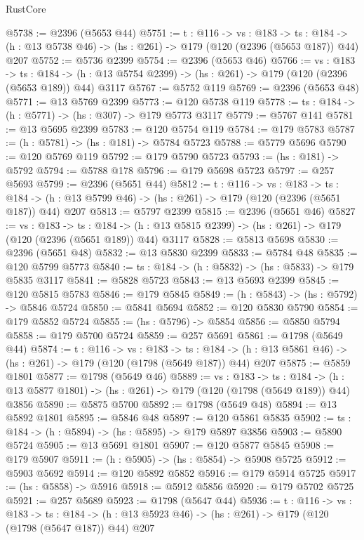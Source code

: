 \begin{lexlean}{RustCore}
\begin{coremodule}
@5738 := @2396 (@5653 @44)
@5751 := {t : @116} ->
  {vs : @183} ->
  {ts : @184} -> (h : @13 @5738 @46) -> (hs : @261) -> @179 (@120 (@2396 (@5653 @187)) @44) @207
@5752 := @5736 @2399
@5754 := @2396 (@5653 @46)
@5766 := {vs : @183} ->
  {ts : @184} -> (h : @13 @5754 @2399) -> (hs : @261) -> @179 (@120 (@2396 (@5653 @189)) @44) @3117
@5767 := @5752 @119
@5769 := @2396 (@5653 @48)
@5771 := @13 @5769 @2399
@5773 := @120 @5738 @119
@5778 := {ts : @184} -> (h : @5771) -> (hs : @307) -> @179 @5773 @3117
@5779 := @5767 @141
@5781 := @13 @5695 @2399
@5783 := @120 @5754 @119
@5784 := @179 @5783
@5787 := (h : @5781) -> (hs : @181) -> @5784 @5723
@5788 := @5779 @5696
@5790 := @120 @5769 @119
@5792 := @179 @5790 @5723
@5793 := (hs : @181) -> @5792
@5794 := @5788 @178
@5796 := @179 @5698 @5723
@5797 := @257 @5693
@5799 := @2396 (@5651 @44)
@5812 := {t : @116} ->
  {vs : @183} ->
  {ts : @184} -> (h : @13 @5799 @46) -> (hs : @261) -> @179 (@120 (@2396 (@5651 @187)) @44) @207
@5813 := @5797 @2399
@5815 := @2396 (@5651 @46)
@5827 := {vs : @183} ->
  {ts : @184} -> (h : @13 @5815 @2399) -> (hs : @261) -> @179 (@120 (@2396 (@5651 @189)) @44) @3117
@5828 := @5813 @5698
@5830 := @2396 (@5651 @48)
@5832 := @13 @5830 @2399
@5833 := @5784 @48
@5835 := @120 @5799 @5773
@5840 := {ts : @184} -> (h : @5832) -> (hs : @5833) -> @179 @5835 @3117
@5841 := @5828 @5723
@5843 := @13 @5693 @2399
@5845 := @120 @5815 @5783
@5846 := @179 @5845
@5849 := (h : @5843) -> (hs : @5792) -> @5846 @5724
@5850 := @5841 @5694
@5852 := @120 @5830 @5790
@5854 := @179 @5852 @5724
@5855 := (hs : @5796) -> @5854
@5856 := @5850 @5794
@5858 := @179 @5700 @5724
@5859 := @257 @5691
@5861 := @1798 (@5649 @44)
@5874 := {t : @116} ->
  {vs : @183} ->
  {ts : @184} -> (h : @13 @5861 @46) -> (hs : @261) -> @179 (@120 (@1798 (@5649 @187)) @44) @207
@5875 := @5859 @1801
@5877 := @1798 (@5649 @46)
@5889 := {vs : @183} ->
  {ts : @184} -> (h : @13 @5877 @1801) -> (hs : @261) -> @179 (@120 (@1798 (@5649 @189)) @44) @3856
@5890 := @5875 @5700
@5892 := @1798 (@5649 @48)
@5894 := @13 @5892 @1801
@5895 := @5846 @48
@5897 := @120 @5861 @5835
@5902 := {ts : @184} -> (h : @5894) -> (hs : @5895) -> @179 @5897 @3856
@5903 := @5890 @5724
@5905 := @13 @5691 @1801
@5907 := @120 @5877 @5845
@5908 := @179 @5907
@5911 := (h : @5905) -> (hs : @5854) -> @5908 @5725
@5912 := @5903 @5692
@5914 := @120 @5892 @5852
@5916 := @179 @5914 @5725
@5917 := (hs : @5858) -> @5916
@5918 := @5912 @5856
@5920 := @179 @5702 @5725
@5921 := @257 @5689
@5923 := @1798 (@5647 @44)
@5936 := {t : @116} ->
  {vs : @183} ->
  {ts : @184} -> (h : @13 @5923 @46) -> (hs : @261) -> @179 (@120 (@1798 (@5647 @187)) @44) @207

\end{coremodule}
\end{lexlean}
